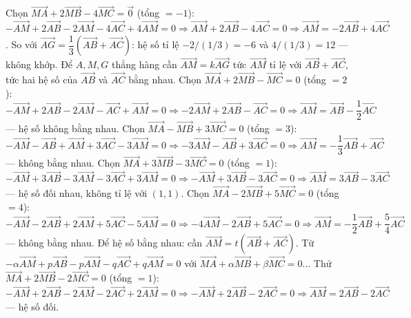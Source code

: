 \begin{bt}
{Chọn $\overrightarrow{MA}+2\overrightarrow{MB}-4\overrightarrow{MC}=\overrightarrow{0}$ (tổng $=-1$): $-\overrightarrow{AM}+2\overrightarrow{AB}-2\overrightarrow{AM}-4\overrightarrow{AC}+4\overrightarrow{AM}=0\Rightarrow \overrightarrow{AM}+2\overrightarrow{AB}-4\overrightarrow{AC}=0\Rightarrow\overrightarrow{AM}=-2\overrightarrow{AB}+4\overrightarrow{AC}$. So với $\overrightarrow{AG}=\dfrac13(\overrightarrow{AB}+\overrightarrow{AC})$: hệ số tỉ lệ $-2/(1/3)=-6$ và $4/(1/3)=12$ — không khớp.
Để $A,M,G$ thẳng hàng cần $\overrightarrow{AM}=k\overrightarrow{AG}$ tức $\overrightarrow{AM}$ tỉ lệ với $\overrightarrow{AB}+\overrightarrow{AC}$, tức hai hệ số của $\overrightarrow{AB}$ và $\overrightarrow{AC}$ bằng nhau. 
Chọn $\overrightarrow{MA}+2\overrightarrow{MB}-\overrightarrow{MC}=0$ (tổng $=2$): $-\overrightarrow{AM}+2\overrightarrow{AB}-2\overrightarrow{AM}-\overrightarrow{AC}+\overrightarrow{AM}=0\Rightarrow -2\overrightarrow{AM}+2\overrightarrow{AB}-\overrightarrow{AC}=0\Rightarrow\overrightarrow{AM}=\overrightarrow{AB}-\dfrac12\overrightarrow{AC}$ — hệ số không bằng nhau.
Chọn $\overrightarrow{MA}-\overrightarrow{MB}+3\overrightarrow{MC}=0$ (tổng $=3$): $-\overrightarrow{AM}-\overrightarrow{AB}+\overrightarrow{AM}+3\overrightarrow{AC}-3\overrightarrow{AM}=0\Rightarrow -3\overrightarrow{AM}-\overrightarrow{AB}+3\overrightarrow{AC}=0\Rightarrow\overrightarrow{AM}=-\dfrac13\overrightarrow{AB}+\overrightarrow{AC}$ — không bằng nhau.
Chọn $\overrightarrow{MA}+3\overrightarrow{MB}-3\overrightarrow{MC}=0$ (tổng $=1$): $-\overrightarrow{AM}+3\overrightarrow{AB}-3\overrightarrow{AM}-3\overrightarrow{AC}+3\overrightarrow{AM}=0\Rightarrow -\overrightarrow{AM}+3\overrightarrow{AB}-3\overrightarrow{AC}=0\Rightarrow\overrightarrow{AM}=3\overrightarrow{AB}-3\overrightarrow{AC}$ — hệ số đối nhau, không tỉ lệ với $(1,1)$.
Chọn $\overrightarrow{MA}-2\overrightarrow{MB}+5\overrightarrow{MC}=0$ (tổng $=4$): $-\overrightarrow{AM}-2\overrightarrow{AB}+2\overrightarrow{AM}+5\overrightarrow{AC}-5\overrightarrow{AM}=0\Rightarrow -4\overrightarrow{AM}-2\overrightarrow{AB}+5\overrightarrow{AC}=0\Rightarrow\overrightarrow{AM}=-\dfrac12\overrightarrow{AB}+\dfrac54\overrightarrow{AC}$ — không bằng nhau.
Để hệ số bằng nhau: cần $\overrightarrow{AM}=t(\overrightarrow{AB}+\overrightarrow{AC})$. Từ $-\alpha\overrightarrow{AM}+p\overrightarrow{AB}-p\overrightarrow{AM}-q\overrightarrow{AC}+q\overrightarrow{AM}=0$ với $\overrightarrow{MA}+\alpha\overrightarrow{MB}+\beta\overrightarrow{MC}=0$... 
Thử $\overrightarrow{MA}+2\overrightarrow{MB}-2\overrightarrow{MC}=0$ (tổng $=1$): $-\overrightarrow{AM}+2\overrightarrow{AB}-2\overrightarrow{AM}-2\overrightarrow{AC}+2\overrightarrow{AM}=0\Rightarrow-\overrightarrow{AM}+2\overrightarrow{AB}-2\overrightarrow{AC}=0\Rightarrow\overrightarrow{AM}=2\overrightarrow{AB}-2\overrightarrow{AC}$ — hệ số đối.
}
\end{bt}
